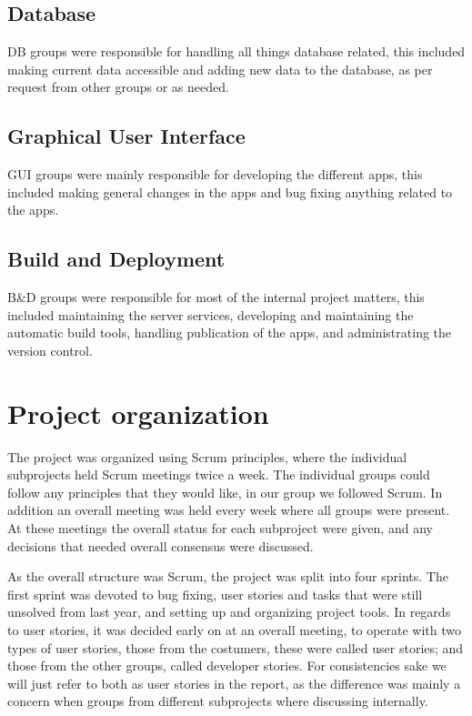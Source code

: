 \subsection{Database}
DB groups were responsible for handling all things database related, this included making current data accessible and adding new data to the database, as per request from other groups or as needed.

\subsection{Graphical User Interface}
GUI groups were mainly responsible for developing the different apps, this included making general changes in the apps and bug fixing anything related to the apps.

\subsection{Build and Deployment}
B\&D groups were responsible for most of the internal project matters, this included maintaining the server services, developing and maintaining the automatic build tools, handling publication of the apps, and administrating the version control.

\section{Project organization}
The project was organized using Scrum principles, where the individual subprojects held Scrum meetings twice a week. The individual groups could follow any principles that they would like, in our group we followed Scrum.
In addition an overall meeting was held every week where all groups were present. At these meetings the overall status for each subproject were given, and any decisions that needed overall consensus were discussed.

As the overall structure was Scrum, the project was split into four sprints. The first sprint was devoted to bug fixing, user stories and tasks that were still unsolved from last year, and setting up and organizing project tools. In regards to user stories, it was decided early on at an overall meeting, to operate with two types of user stories, those from the costumers, these were called user stories; and those from the other groups, called developer stories. For consistencies sake we will just refer to both as user stories in the report, as the difference was mainly a concern when groups from different subprojects where discussing internally.

